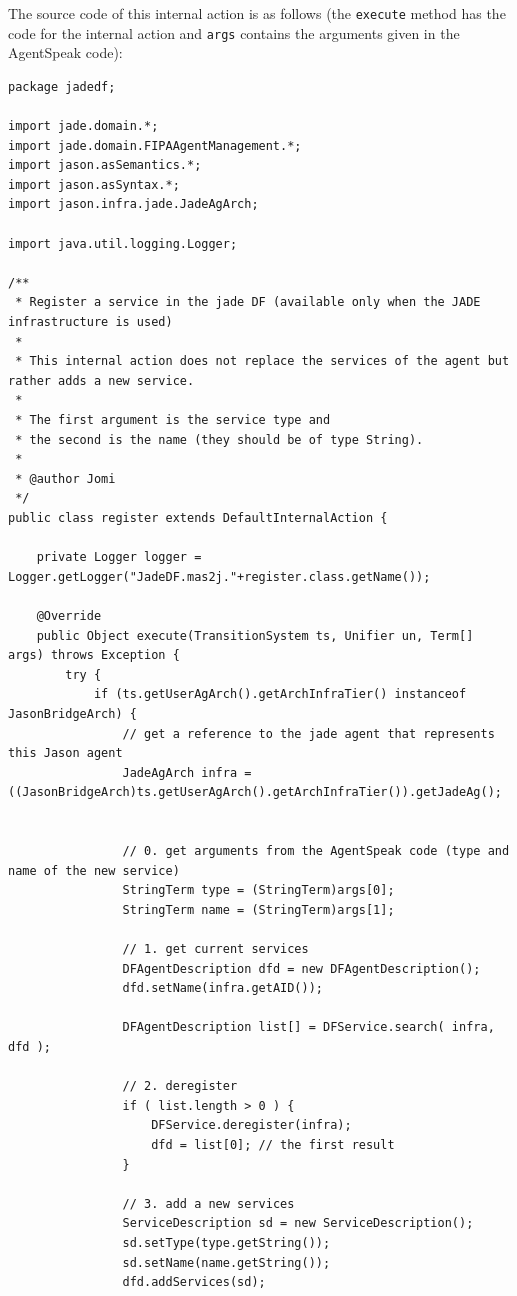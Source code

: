 \documentclass[a4paper]{article}
\begin{document}
\begin{enumerate}
  The source code of this internal action is as follows (the
  \texttt{execute} method has the code for the internal action and
  \texttt{args} contains the arguments given in the AgentSpeak code):

\begin{verbatim}
package jadedf;

import jade.domain.*;
import jade.domain.FIPAAgentManagement.*;
import jason.asSemantics.*;
import jason.asSyntax.*;
import jason.infra.jade.JadeAgArch;

import java.util.logging.Logger;

/** 
 * Register a service in the jade DF (available only when the JADE infrastructure is used)
 *
 * This internal action does not replace the services of the agent but
rather adds a new service.
 *
 * The first argument is the service type and
 * the second is the name (they should be of type String).
 * 
 * @author Jomi
 */
public class register extends DefaultInternalAction {

    private Logger logger = Logger.getLogger("JadeDF.mas2j."+register.class.getName());

    @Override
    public Object execute(TransitionSystem ts, Unifier un, Term[] args) throws Exception {
        try {
            if (ts.getUserAgArch().getArchInfraTier() instanceof JasonBridgeArch) {
                // get a reference to the jade agent that represents this Jason agent
                JadeAgArch infra = ((JasonBridgeArch)ts.getUserAgArch().getArchInfraTier()).getJadeAg();


                // 0. get arguments from the AgentSpeak code (type and name of the new service)
                StringTerm type = (StringTerm)args[0];
                StringTerm name = (StringTerm)args[1];
                
                // 1. get current services
                DFAgentDescription dfd = new DFAgentDescription();
                dfd.setName(infra.getAID());

                DFAgentDescription list[] = DFService.search( infra, dfd );

                // 2. deregister
                if ( list.length > 0 ) { 
                    DFService.deregister(infra);
                    dfd = list[0]; // the first result 
                }

                // 3. add a new services
                ServiceDescription sd = new ServiceDescription();
                sd.setType(type.getString());
                sd.setName(name.getString());
                dfd.addServices(sd);
                

\end{verbatim}
\end{enumerate}
\end{document}
